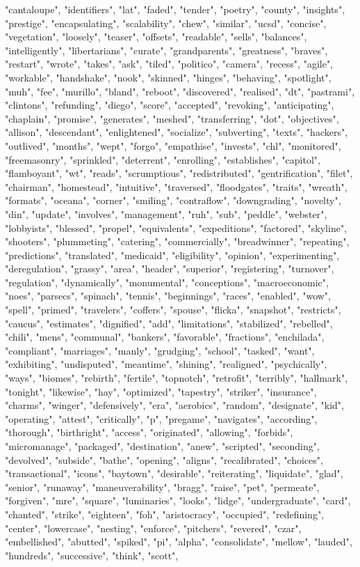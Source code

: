 "cantaloupe", "identifiers", "lat", "faded", "tender", "poetry", "county", "insights", "prestige", "encapsulating", "scalability", "chew", "similar", "ucsd", "concise", "vegetation", "loosely", "teaser", "offsets", "readable", "sells", "balances", "intelligently", "libertarians", "curate", "grandparents", "greatness", "braves", "restart", "wrote", "takes", "ask", "tiled", "politico", "camera", "recess", "agile", "workable", "handshake", "nook", "skinned", "hinges", "behaving", "spotlight", "muh", "fee", "murillo", "bland", "reboot", "discovered", "realised", "dt", "pastrami", "clintons", "refunding", "diego", "score", "accepted", "revoking", "anticipating", "chaplain", "promise", "generates", "meshed", "transferring", "dot", "objectives", "allison", "descendant", "enlightened", "socialize", "subverting", "texts", "hackers", "outlived", "months", "wept", "forgo", "empathise", "invests", "chl", "monitored", "freemasonry", "sprinkled", "deterrent", "enrolling", "establishes", "capitol", "flamboyant", "wt", "reads", "scrumptious", "redistributed", "gentrification", "filet", "chairman", "homestead", "intuitive", "traversed", "floodgates", "traits", "wreath", "formats", "oceana", "corner", "smiling", "contraflow", "downgrading", "novelty", "din", "update", "involves", "management", "ruh", "sub", "peddle", "webster", "lobbyists", "blessed", "propel", "equivalents", "expeditions", "factored", "skyline", "shooters", "plummeting", "catering", "commercially", "breadwinner", "repeating", "predictions", "translated", "medicaid", "eligibility", "opinion", "experimenting", "deregulation", "grassy", "area", "header", "superior", "registering", "turnover", "regulation", "dynamically", "monumental", "conceptions", "macroeconomic", "noes", "parsecs", "spinach", "tennis", "beginnings", "races", "enabled", "wow", "spell", "primed", "travelers", "coffers", "spouse", "flicka", "snapshot", "restricts", "caucus", "estimates", "dignified", "add", "limitations", "stabilized", "rebelled", "chili", "mens", "communal", "bankers", "favorable", "fractions", "enchilada", "compliant", "marriages", "manly", "grudging", "school", "tasked", "want", "exhibiting", "undisputed", "meantime", "shining", "realigned", "psychically", "ways", "biomes", "rebirth", "fertile", "topnotch", "retrofit", "terribly", "hallmark", "tonight", "likewise", "hay", "optimized", "tapestry", "striker", "insurance", "charms", "winger", "defensively", "era", "aerobics", "random", "designate", "kid", "operating", "attest", "critically", "p", "pregame", "navigates", "according", "thorough", "birthright", "access", "originated", "allowing", "forbids", "micromanage", "packaged", "destination", "anew", "scripted", "seconding", "devolved", "subside", "bathe", "opening", "aligns", "recalibrated", "choices", "transactional", "icons", "baytown", "desirable", "reiterating", "liquidate", "glad", "senior", "runaway", "maneuverability", "bragg", "raise", "pet", "permeate", "forgiven", "mre", "square", "luminaries", "looks", "lidge", "undergraduate", "card", "chanted", "strike", "eighteen", "foh", "aristocracy", "occupied", "redefining", "center", "lowercase", "nesting", "enforce", "pitchers", "revered", "czar", "embellished", "abutted", "spiked", "pi", "alpha", "consolidate", "mellow", "lauded", "hundreds", "successive", "think", "scott", 
